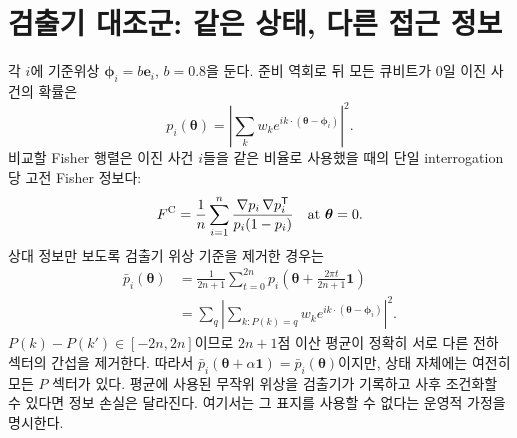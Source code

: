 \documentclass[11pt,a4paper]{article}
\begin{document}
\section{검출기 대조군: 같은 상태, 다른 접근 정보}
각 $i$에 기준위상 $\boldsymbol\phi_i=b\boldsymbol e_i$, $b=0.8$을 둔다.
준비 역회로 뒤 모든 큐비트가 0일 이진 사건의 확률은
\begin{equation}
 p_i(\boldsymbol\theta)=
 \left|\sum_k w_k e^{ik\cdot(\boldsymbol\theta-\boldsymbol\phi_i)}\right|^2.
\end{equation}
비교할 Fisher 행렬은 이진 사건 $i$들을 같은 비율로 사용했을 때의
단일 interrogation당 고전 Fisher 정보다:
\begin{equation}
 F^{\rm C}=\frac1n\sum_{i=1}^n
 \frac{\nabla p_i\,\nabla p_i^{\mathsf T}}{p_i(1-p_i)}
 \quad\text{at }\boldsymbol\theta=0.
\end{equation}
상대 정보만 보도록 검출기 위상 기준을 제거한 경우는
\begin{align}
 \bar p_i(\boldsymbol\theta)
 &=\frac1{2n+1}\sum_{t=0}^{2n}
 p_i\!\left(\boldsymbol\theta+
 \frac{2\pi t}{2n+1}\boldsymbol 1\right)\\
 &=\sum_q\left|
 \sum_{k:P(k)=q}w_k
 e^{ik\cdot(\boldsymbol\theta-\boldsymbol\phi_i)}
 \right|^2 .
\end{align}
$P(k)-P(k')\in[-2n,2n]$이므로 $2n+1$점 이산 평균이 정확히
서로 다른 전하 섹터의 간섭을 제거한다. 따라서
$\bar p_i(\boldsymbol\theta+\alpha\boldsymbol 1)=
\bar p_i(\boldsymbol\theta)$이지만, 상태 자체에는 여전히 모든
$P$ 섹터가 있다. 평균에 사용된 무작위 위상을 검출기가 기록하고
사후 조건화할 수 있다면 정보 손실은 달라진다. 여기서는 그 표지를
사용할 수 없다는 운영적 가정을 명시한다.
\end{document}
